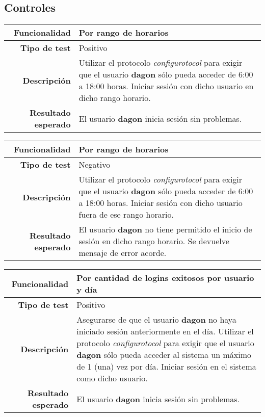 \documentclass[a4paper,10pt]{article}
\begin{document}
\subsection{Controles}

\begin{center}
  \begin{tabular}{|r|p{12.5cm}|}
    \hline
    \textbf{Funcionalidad}	&	Por rango de horarios\\
    \hline
    \textbf{Tipo de test}	&	Positivo\\
    \hline
    \textbf{Descripción}	&	Utilizar el protocolo \textit{configurotocol} para exigir que el usuario
					\textbf{dagon} sólo pueda acceder de 6:00 a 18:00 horas. Iniciar sesión con
					dicho usuario en dicho rango horario.\\
    \hline
    \textbf{Resultado esperado}	&	El usuario \textbf{dagon} inicia sesión sin problemas.\\
    \hline   
  \end{tabular}
\end{center}

\begin{center}
  \begin{tabular}{|r|p{12.5cm}|}
    \hline
    \textbf{Funcionalidad}	&	Por rango de horarios\\
    \hline
    \textbf{Tipo de test}	&	Negativo\\
    \hline
    \textbf{Descripción}	&	Utilizar el protocolo \textit{configurotocol} para exigir que el usuario
					\textbf{dagon} sólo pueda acceder de 6:00 a 18:00 horas. Iniciar sesión con
					dicho usuario fuera de ese rango horario.\\
    \hline
    \textbf{Resultado esperado}	&	El usuario \textbf{dagon} no tiene permitido el inicio de sesión en dicho
					rango horario. Se devuelve mensaje de error acorde.\\
    \hline   
  \end{tabular}
\end{center}

\begin{center}
  \begin{tabular}{|r|p{12.5cm}|}
    \hline
    \textbf{Funcionalidad}	&	Por cantidad de logins exitosos por usuario y día\\
    \hline
    \textbf{Tipo de test}	&	Positivo\\
    \hline
    \textbf{Descripción}	&	Asegurarse de que el usuario \textbf{dagon} no haya iniciado sesión
					anteriormente en el día.
					Utilizar el protocolo \textit{configurotocol} para exigir que el usuario
					\textbf{dagon} sólo pueda acceder al sistema un máximo de 1 (una) vez
					por día. Iniciar sesión en el sistema como dicho usuario.\\
    \hline
    \textbf{Resultado esperado}	&	El usuario \textbf{dagon} inicia sesión sin problemas.\\
    \hline   
  \end{tabular}
\end{center}
\end{document}

